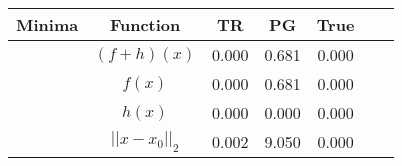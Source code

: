 \begin{tabular}{| c |c |c || c |c |c |c |}
    \hline
Minima    %
    \rowcolor[gray]{0.9}
   & Function & TR & PG & True \\
    \hline
  \rowcolor[gray]{0.7}
     & $ (f + h)(x) $ & 0.000 & 0.681 & 0.000 \\
  \rowcolor[gray]{0.8}
     & $ f(x) $ & 0.000 & 0.681 & 0.000 \\
  \rowcolor[gray]{0.7}
     & $ h(x) $ & 0.000 & 0.000 & 0.000 \\
  \rowcolor[gray]{0.8}
     & $ ||x - x_0||_2 $ & 0.002 & 9.050 & 0.000 \\
\end{tabular}
